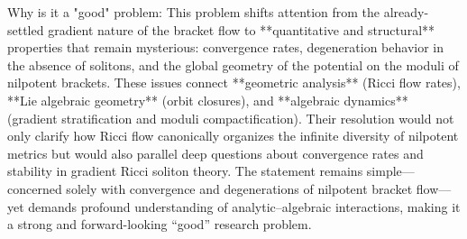 Why is it a "good" problem:  
This problem shifts attention from the already-settled gradient nature of the bracket flow to **quantitative and structural** properties that remain mysterious: convergence rates, degeneration behavior in the absence of solitons, and the global geometry of the potential on the moduli of nilpotent brackets. These issues connect **geometric analysis** (Ricci flow rates), **Lie algebraic geometry** (orbit closures), and **algebraic dynamics** (gradient stratification and moduli compactification).  
Their resolution would not only clarify how Ricci flow canonically organizes the infinite diversity of nilpotent metrics but would also parallel deep questions about convergence rates and stability in gradient Ricci soliton theory.  
The statement remains simple—concerned solely with convergence and degenerations of nilpotent bracket flow—yet demands profound understanding of analytic–algebraic interactions, making it a strong and forward-looking “good” research problem.